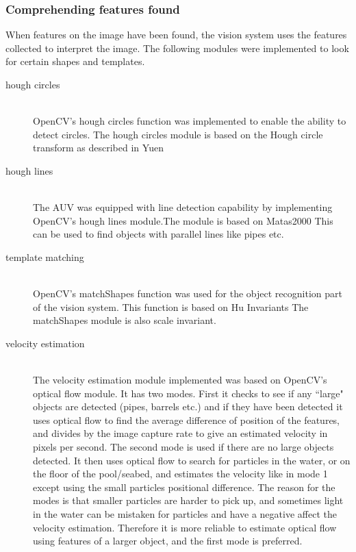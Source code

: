 \subsubsection{Comprehending features found} 
When features on the image have been found, the vision system uses the features collected to interpret the image. The following modules were implemented to look for certain shapes and templates.
\begin{description}
\item[hough circles]\hfill \\
OpenCV's hough circles function was implemented to enable the ability to detect circles. The hough circles module is based on the Hough circle transform as described in Yuen \cite{article:yuen} 

\item[hough lines]\hfill \\
The AUV was equipped with line detection capability by implementing OpenCV's hough lines module.The module is based on Matas2000 \cite{article:matas} This can be used to find objects with parallel lines like pipes etc.

\item[template matching]\hfill \\
OpenCV's matchShapes function was used for the object recognition part of the vision system. This function is based on Hu Invariants \cite{article:hu} The matchShapes module is also scale invariant.

\item[velocity estimation]\hfill \\
The velocity estimation module implemented was based on OpenCV's optical flow module. It has two modes. First it checks to see if any ``large" objects are detected (pipes, barrels etc.) and if they have been detected it uses optical flow to find the average difference of position of the features, and divides by the image capture rate to give an estimated velocity in pixels per second. 
The second mode is used if there are no large objects detected. It then uses optical flow to search for particles in the water, or on the floor of the pool/seabed, and estimates the velocity like in mode 1 except using the small particles positional difference. The reason for the modes is that smaller particles are harder to pick up, and sometimes light in the water can be mistaken for particles and have a negative affect the velocity estimation. Therefore it is more reliable to estimate optical flow using features of a larger object, and the first mode is preferred.
\end{description}

